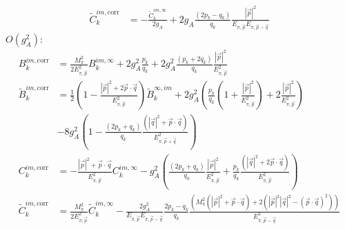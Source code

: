 \documentclass[11pt,prd,aps,showpacs,eqsecnum,floatfix,nofootinbib,preprint,tightenlines]{revtex4}
\newcommand{\Epipmq}{E_{\pi, \vec{p}-\vec{q}}}
\newcommand{\Epippq}{E_{\pi, \vec{p}+\vec{q}}}
\newcommand{\Epip}{E_{\pi, \vec{p}}}
\newcommand{\psq}{|\vec{p}|^2}
\newcommand{\qsq}{|\vec{q}|^2}
\newcommand{\pq}{\vec{p} \cdot \vec{q}}
\begin{document}
\begin{appendix}
\begin{align}
	\tilde{C}^{im,\text{corr}}_k &= -\frac{\tilde{C}^{im,\infty}_k}{2 g_A}
		+ 2 g_A \frac{(2 p_k - q_k)}{q_k} \frac{\psq}{\Epip \Epipmq}
\end{align}
$O(g_A^2)$:
\begin{align}
	B^{im,\text{corr}}_k &= \frac{M^2_\pi}{2\Epip^2} B^{im,\infty}_k
		+ 2 g_A^2 \frac{p_k}{q_k} + 2 g_A^2 \frac{(p_k + 2 q_k)}{q_k} \frac{\psq}{\Epip^2}
	\\[0.3cm]
	\tilde{B}^{im,\text{corr}}_k &= \frac{1}{2} \left( 1 - \frac{\psq + 2\pq}{\Epip^2} \right) \tilde{B}^{\infty, im}_k + 2 g_A^2 \left( \frac{p_k}{q_k} \left( 1 + \frac{\psq}{\Epip^2} \right) + 2 \frac{\psq}{\Epip^2} \right)
		\\
		&- 8 g_A^2 \left( 1 - \frac{(2p_k + q_k)}{q_k} \frac{( \qsq + \pq )}{\Epippq^2} \right)
	\nonumber\\[0.3cm]
	C^{im,\text{corr}}_k &= -\frac{\psq + \pq}{\Epip^2}C^{im,\infty}_k
		- g_A^2 \left( \frac{( 2 p_k + q_k )}{q_k} \frac{\psq}{\Epip^2} + \frac{p_k}{q_k} \frac{(\qsq + 2 \pq)}{\Epip^2} \right)
	\\[0.3cm]
	\tilde{C}^{im,\text{corr}}_k &= \frac{M^2_\pi}{2 \Epip^2} \tilde{C}^{im,\infty}_k
		- \frac{2g_A^2}{\Epip \Epipmq} \frac{2p_k - q_k}{q_k} \frac{\left( M^2_\pi ( \psq + \pq ) + 2 ( \psq \qsq - (\pq)^2)\right)}{\Epipmq^2}
\end{align}
 
\end{appendix}
\end{document}
